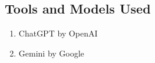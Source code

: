 \subsection{Tools and Models Used}

\begin{enumerate}
    \item ChatGPT by OpenAI
    \item Gemini by Google
\end{enumerate}
